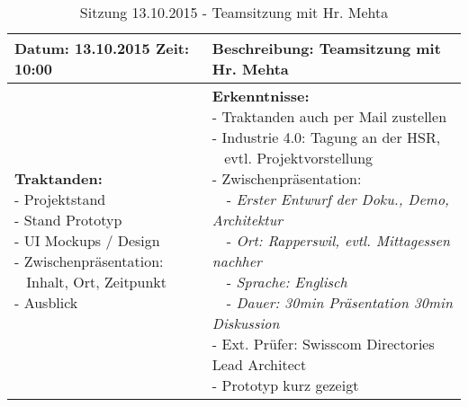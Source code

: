 \begin{table}[H]
\begin{tabularx}{\textwidth}{| l | X |}
\hline
\textbf{Datum:} 13.10.2015
\textbf{Zeit:} 10:00
&
\textbf{Beschreibung:} Teamsitzung mit Hr. Mehta \\ \hline
\specialcell[t]{
\textbf{Traktanden:}\\
- Projektstand\\
- Stand Prototyp\\
- UI Mockups / Design\\
- Zwischenpräsentation:\\~ Inhalt, Ort, Zeitpunkt\\
- Ausblick\\
}
& 
\specialcell[t]{
\textbf{Erkenntnisse:}\\
- Traktanden auch per Mail zustellen\\
- Industrie 4.0: Tagung an der HSR,\\~ evtl. Projektvorstellung\\
- Zwischenpräsentation:\\
~~- \textit{Erster Entwurf der Doku., Demo, Architektur}\\
~~- \textit{Ort: Rapperswil, evtl. Mittagessen nachher}\\
~~- \textit{Sprache: Englisch}\\
~~- \textit{Dauer: 30min Präsentation 30min Diskussion}\\
- Ext. Prüfer: Swisscom Directories Lead Architect\\
- Prototyp kurz gezeigt\\
}
\\ \hline
\end{tabularx}
\caption{Sitzung 13.10.2015 - Teamsitzung mit Hr. Mehta}
\end{table}



